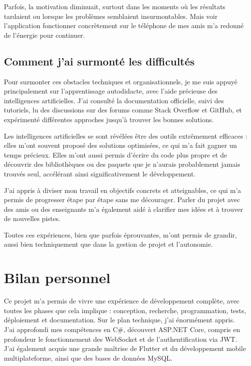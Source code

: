 \documentclass[12pt]{report}
\begin{document}
Parfois, la motivation diminuait, surtout dans les moments où les résultats tardaient ou lorsque les problèmes semblaient insurmontables. Mais voir l’application fonctionner concrètement sur le téléphone de mes amis m’a redonné de l’énergie pour continuer.

\section{Comment j’ai surmonté les difficultés}

Pour surmonter ces obstacles techniques et organisationnels, je me suis appuyé principalement sur l’apprentissage autodidacte, avec l’aide précieuse des intelligences artificielles. J’ai consulté la documentation officielle, suivi des tutoriels, lu des discussions sur des forums comme Stack Overflow et GitHub, et expérimenté différentes approches jusqu’à trouver les bonnes solutions.

Les intelligences artificielles se sont révélées être des outils extrêmement efficaces : elles m’ont souvent proposé des solutions optimisées, ce qui m’a fait gagner un temps précieux. Elles m’ont aussi permis d’écrire du code plus propre et de découvrir des bibliothèques ou des paquets que je n’aurais probablement jamais trouvés seul, accélérant ainsi significativement le développement.

J’ai appris à diviser mon travail en objectifs concrets et atteignables, ce qui m’a permis de progresser étape par étape sans me décourager. Parler du projet avec des amis ou des enseignants m’a également aidé à clarifier mes idées et à trouver de nouvelles pistes.

Toutes ces expériences, bien que parfois éprouvantes, m’ont permis de grandir, aussi bien techniquement que dans la gestion de projet et l’autonomie.


\chapter{Bilan personnel}

Ce projet m’a permis de vivre une expérience de développement complète, avec toutes les phases que cela implique : conception, recherche, programmation, tests, déploiement et documentation. Sur le plan technique, j’ai énormément appris. J’ai approfondi mes compétences en C\#, découvert ASP.NET Core, compris en profondeur le fonctionnement des WebSocket et de l’authentification via JWT. J’ai également acquis une grande maîtrise de Flutter et du développement mobile multiplateforme, ainsi que des bases de données MySQL.
\end{document}
